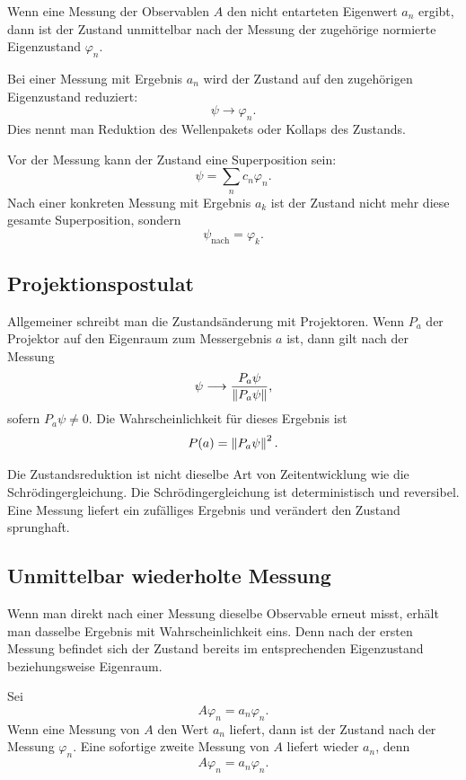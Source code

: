 Wenn eine Messung der Observablen $A$ den nicht entarteten Eigenwert $a_n$ ergibt, dann ist der Zustand unmittelbar nach der Messung der zugehörige normierte Eigenzustand $\varphi_n$.

\begin{definitionbox}
Bei einer Messung mit Ergebnis $a_n$ wird der Zustand auf den zugehörigen Eigenzustand reduziert:
\[
    \psi\longrightarrow \varphi_n.
\]
Dies nennt man Reduktion des Wellenpakets oder Kollaps des Zustands.
\end{definitionbox}

Vor der Messung kann der Zustand eine Superposition sein:
\[
    \psi=\sum_n c_n\varphi_n.
\]
Nach einer konkreten Messung mit Ergebnis $a_k$ ist der Zustand nicht mehr diese gesamte Superposition, sondern
\[
    \psi_{\text{nach}}=\varphi_k.
\]

\subsection{Projektionspostulat}

Allgemeiner schreibt man die Zustandsänderung mit Projektoren. Wenn $P_a$ der Projektor auf den Eigenraum zum Messergebnis $a$ ist, dann gilt nach der Messung
\[
    \psi\longrightarrow \frac{P_a\psi}{\left\lVert P_a\psi \right\rVert},
\]
sofern $P_a\psi\ne 0$.
Die Wahrscheinlichkeit für dieses Ergebnis ist
\[
    P(a)=\left\lVert P_a\psi \right\rVert^2.
\]

\begin{notebox}
Die Zustandsreduktion ist nicht dieselbe Art von Zeitentwicklung wie die Schrödingergleichung. Die Schrödingergleichung ist deterministisch und reversibel. Eine Messung liefert ein zufälliges Ergebnis und verändert den Zustand sprunghaft.
\end{notebox}

\subsection{Unmittelbar wiederholte Messung}

Wenn man direkt nach einer Messung dieselbe Observable erneut misst, erhält man dasselbe Ergebnis mit Wahrscheinlichkeit eins. Denn nach der ersten Messung befindet sich der Zustand bereits im entsprechenden Eigenzustand beziehungsweise Eigenraum.

\begin{examplebox}
Sei
\[
    A\varphi_n=a_n\varphi_n.
\]
Wenn eine Messung von $A$ den Wert $a_n$ liefert, dann ist der Zustand nach der Messung $\varphi_n$. Eine sofortige zweite Messung von $A$ liefert wieder $a_n$, denn
\[
    A\varphi_n=a_n\varphi_n.
\]
\end{examplebox}

